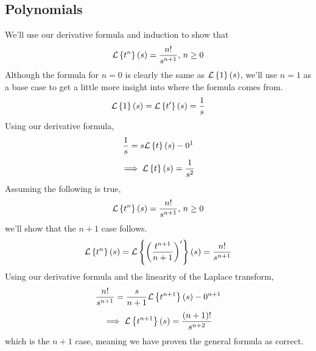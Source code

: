 \subsection{Polynomials}
\noindent
We'll use our derivative formula and induction to show that
\begin{equation*}
	\mathcal{L}\left\{ t^n \right\}\left(s\right) = \frac{n!}{s^{n+1}} \text{, } n \geq 0
\end{equation*}
Although the formula for $n = 0$ is clearly the same as $\mathcal{L}\left\{ 1 \right\}\left(s\right)$, we'll use $n = 1$ as a base case to get a little more insight into where the formula comes from.\\
\begin{equation*}
	\mathcal{L}\left\{ 1 \right\}\left(s\right) = \mathcal{L}\left\{ t' \right\}\left(s\right) = \frac{1}{s}
\end{equation*}
Using our derivative formula,
\begin{equation*}
	\frac{1}{s} = s\mathcal{L}\left\{ t \right\}\left(s\right) - 0^{1}
\end{equation*}
\begin{equation*}
	\implies \mathcal{L}\left\{ t \right\}\left(s\right) = \frac{1}{s^2}
\end{equation*}
Assuming the following is true,
\begin{equation*}
	\mathcal{L}\left\{ t^n \right\}\left(s\right) = \frac{n!}{s^{n+1}} \text{, } n \geq 0
\end{equation*}
we'll show that the $n+1$ case follows.
\begin{equation*}
	\mathcal{L}\left\{ t^n \right\}\left(s\right) = \mathcal{L}\left\{ \left(\frac{t^{n+1}}{n+1}\right)' \right\}\left(s\right) = \frac{n!}{s^{n+1}}
\end{equation*}
Using our derivative formula and the linearity of the Laplace transform,
\begin{equation*}
	\frac{n!}{s^{n+1}} = \frac{s}{n+1}\mathcal{L}\left\{ t^{n+1} \right\}\left(s\right) - 0^{n+1}
\end{equation*}
\begin{equation*}
	\implies \mathcal{L}\left\{ t^{n+1} \right\}\left(s\right) = \frac{(n+1)!}{s^{n+2}}
\end{equation*}
which is the $n+1$ case, meaning we have proven the general formula as correct.